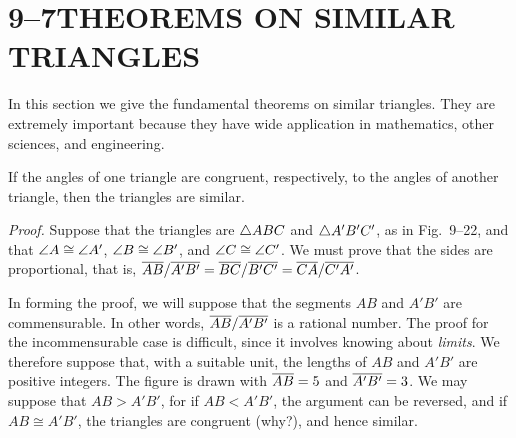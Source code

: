 \documentclass[11pt]{book}
\begin{document}
\section*{9--7\quad THEOREMS ON SIMILAR TRIANGLES}

In this section we give the fundamental theorems on similar triangles. They are
extremely important because they have wide application in mathematics, other
sciences, and engineering.

\begin{theorem}
If the angles of one triangle are congruent, respectively, to the angles of
another triangle, then the triangles are similar.
\end{theorem}

\noindent\emph{Proof.} Suppose that the triangles are $\triangle ABC$ and
$\triangle A'B'C'$, as in Fig.~9--22, and that $\angle A \cong \angle A'$,
$\angle B \cong \angle B'$, and $\angle C \cong \angle C'$. We must prove that the
sides are proportional, that is, $\overline{AB}/\overline{A'B'} = \overline{BC}/\overline{B'C'} =
\overline{CA}/\overline{C'A'}$.

\FIGIXTWENTYTWO

In forming the proof, we will suppose that the segments $AB$ and $A'B'$ are
commensurable. In other words, $\overline{AB}/\overline{A'B'}$ is a rational number. The
proof for the incommensurable case is difficult, since it involves knowing about
\emph{limits}. We therefore suppose that, with a suitable unit, the lengths of
$AB$ and $A'B'$ are positive integers. The figure is drawn with $\overline{AB} = 5$ and
$\overline{A'B'} = 3$. We may suppose that $AB > A'B'$, for if $AB < A'B'$, the
argument can be reversed, and if $AB \cong A'B'$, the triangles are congruent
(why?), and hence similar.
\end{document}
